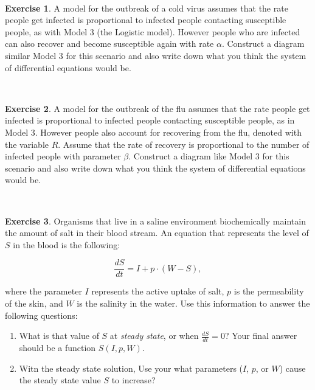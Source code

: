 \documentclass[
]{book}
\theoremstyle{definition}
\theoremstyle{definition}
\theoremstyle{definition}
\newtheorem{exercise}{Exercise}[chapter]
\theoremstyle{remark}
\begin{document}
~

\begin{exercise}
\protect\hypertarget{exr:unnamed-chunk-9}{}{\label{exr:unnamed-chunk-9} }A model for the outbreak of a cold virus assumes that the rate people get infected is proportional to infected people contacting susceptible people, as with Model 3 (the Logistic model). However people who are infected can also recover and become susceptible again with rate \(\alpha\). Construct a diagram similar Model 3 for this scenario and also write down what you think the system of differential equations would be.
\end{exercise}
~

\begin{exercise}
\protect\hypertarget{exr:unnamed-chunk-10}{}{\label{exr:unnamed-chunk-10} }A model for the outbreak of the flu assumes that the rate people get infected is proportional to infected people contacting susceptible people, as in Model 3. However people also account for recovering from the flu, denoted with the variable \(R\). Assume that the rate of recovery is proportional to the number of infected people with parameter \(\beta\). Construct a diagram like Model 3 for this scenario and also write down what you think the system of differential equations would be.
\end{exercise}
~
\begin{exercise}
\protect\hypertarget{exr:unnamed-chunk-11}{}{\label{exr:unnamed-chunk-11} }Organisms that live in a saline environment biochemically maintain the amount of salt in their blood stream. An equation that represents the level of \(S\) in the blood is the following:

\[\frac{dS}{dt} = I + p \cdot (W - S), \]

where the parameter \(I\) represents the active uptake of salt, \(p\) is the permeability of the skin, and \(W\) is the salinity in the water. Use this information to answer the following questions:

\begin{enumerate}[label=\alph*.]
  \item What is that value of $S$ at \emph{steady state}, or when $\displaystyle \frac{dS}{dt} = 0$?  Your final answer should be a function $S(I,p,W)$.
  \item Witn the steady state solution, Use your what parameters ($I$, $p$, or $W$) cause the steady state value $S$ to increase?
  \end{enumerate}
\end{exercise}
\end{document}
